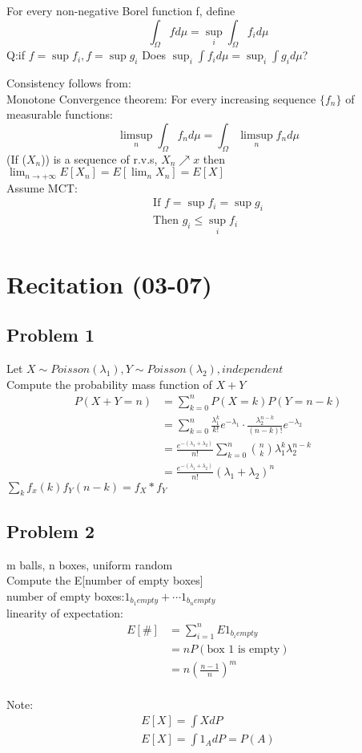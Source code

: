 \begin{definition}[]{}
For every non-negative Borel function f, define $$
    \int_\Omega f d\mu=\sup_i\int_\Omega f_i d\mu
$$ Q:if $ f=\sup f_i,f=\sup g_i $ Does $ \sup_i \int f_id\mu=\sup_i \int g_id\mu $? 
\end{definition}
Consistency follows from:\\
Monotone Convergence theorem: For every increasing sequence $ \{f_n\} $ of measurable functions:$$
    \limsup_n \int_\Omega f_n d\mu=\int_\Omega \limsup_n f_n d\mu
$$  (If ($ X_n $)) is a sequence of r.v.s, $ X_n\nearrow x $  then $ \lim_{n\rightarrow+\infty} E[X_n]=E[\lim_n X_n]=E[X] $
\\Assume MCT:\begin{align*}{}{}
\text{If }f=\sup f_i=\sup g_i\\
\text{Then } g_i\leq \sup_i f_i
\end{align*}
\section{Recitation (03-07)}
\subsection*{Problem 1}
Let $ X\sim Poisson(\lambda_1),Y\sim Poisson(\lambda_2), independent $ 
\\Compute the probability mass function of $ X+Y $
\begin{align*}{}{}
P(X+Y=n)&=\sum_{k=0}^{n}P(X=k)P(Y=n-k)\\
&=\sum_{k=0}^{n}\frac{\lambda_1^k}{k!}e^{-\lambda_1}\cdot \frac{\lambda_2^{n-k}}{(n-k)!}e^{-\lambda_2}\\
&=\frac{e^{-(\lambda_1+\lambda_2)}}{n!}\sum_{k=0}^{n}\binom{n}{k}\lambda_1^k\lambda_2^{n-k}\\
&=\frac{e^{-(\lambda_1+\lambda_2)}}{n!}(\lambda_1+\lambda_2)^n
\end{align*}
\textbf{$ \sum_kf_x(k)f_Y(n-k)=f_X*f_Y $ }
\subsection*{Problem 2}
m balls, n boxes, uniform random
\\Compute the E[number of empty boxes]
\\number of empty boxes:$ 1_{b_1empty}+\cdots1_{b_nempty} $ 
\\linearity of expectation: \begin{align*}{}{}
E[\#]&=\sum_{i=1}^{n}E 1_{b_i empty}\\
&=nP(\text{box 1 is empty})\\
&=n(\frac{n-1}{n})^m
\end{align*} 
\\Note: \begin{align*}{}{}
E[X]=\int XdP\\
E[X]=\int 1_A dP=P(A)
\end{align*}
